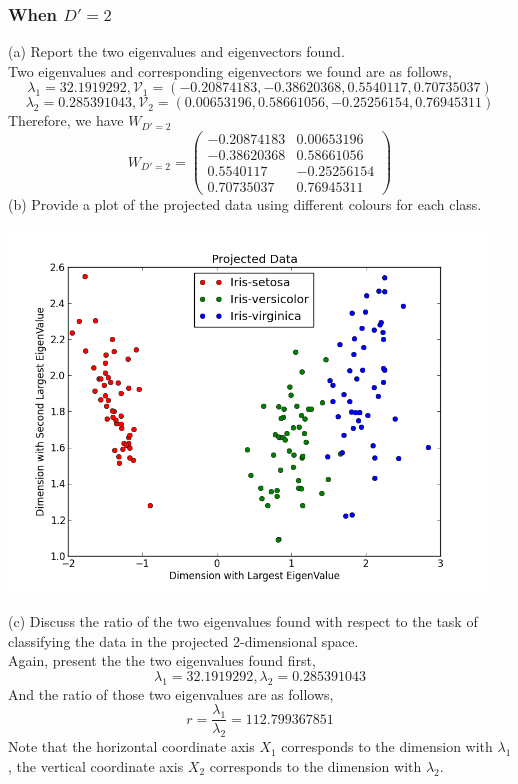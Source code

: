 \documentclass[11pt,a4paper]{article}
\newcommand{\htab}{\hspace*{0.63cm}}
\newcommand{\V}{\mathcal{V}}
\begin{document}
\subsubsection{When $D' = 2$}
(a) Report the two eigenvalues and eigenvectors found. \\
\htab Two eigenvalues and corresponding eigenvectors we found are as follows,
    $$ \lambda_{1} = 32.1919292, 
    \V_{1} = (-0.20874183, -0.38620368,  0.5540117, 0.70735037)  $$
    $$ \lambda_{2} = 0.285391043, 
    \V_{2} = (0.00653196,  0.58661056, -0.25256154,  0.76945311) $$
\htab Therefore, we have $W_{D'=2}$
$$ W_{D'=2} = \begin{pmatrix}
    -0.20874183 & 0.00653196  \\
    -0.38620368 & 0.58661056  \\
    0.5540117 & -0.25256154 \\
    0.70735037 &  0.76945311
   \end{pmatrix} $$
(b) Provide a plot of the projected data using different colours for each class.
\begin{center}
    \includegraphics[width=5in,height=3.8in]{./picture/figure_1.png}
\end{center}
(c) Discuss the ratio of the two eigenvalues found with respect to the task of classifying the data in the projected 2-dimensional space. \\
\htab Again, present the the two eigenvalues found first,
    $$ \lambda_{1} = 32.1919292,  \lambda_{2} = 0.285391043 $$
\htab And the ratio of those two eigenvalues are as follows,
    $$ r = \frac{\lambda_{1}}{\lambda_{2}} = 112.799367851 $$
    \htab Note that the horizontal coordinate axis $X_{1}$ corresponds to the dimension with $\lambda_{1}$, the vertical coordinate axis $X_{2}$ corresponds to the dimension with $\lambda_{2}$. \\
\end{document}
